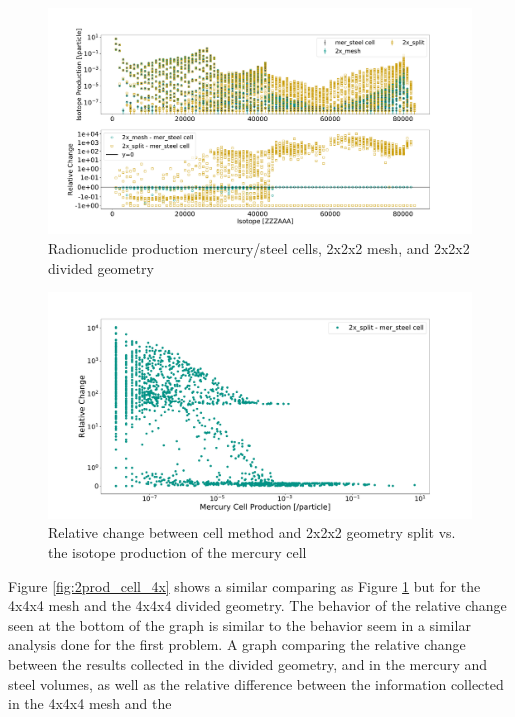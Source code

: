 %
\begin{figure}[H]
 \centering
 \includegraphics[scale=0.42,trim={2cm 1cm 3cm 2cm},clip]{../figs/toy_p2/prod_VPII_2x.pdf}
 \caption{Radionuclide production mercury/steel cells, 2x2x2 mesh, and 2x2x2 divided geometry}
 \label{fig:2prod_cell_2x}
\end{figure}
%
\begin{figure}[H]
 \centering
 \includegraphics[scale=0.4,trim={3cm 0.5cm 3cm 3cm},clip]{../figs/toy_p2/prod_VPII_rc_2x_split.pdf}
 \caption{Relative change between cell method and 2x2x2 geometry split vs. the isotope production of the mercury cell}
 \label{fig:2prod_cell_2x_rc}
\end{figure}
%
Figure \ref{fig:2prod_cell_4x} shows a similar comparing as Figure
\ref{fig:2prod_cell_2x} but for the 4x4x4 mesh and the 4x4x4 divided geometry.
The behavior of the relative change seen at the bottom of the graph is similar
to the behavior seem in a similar analysis done for the first problem.
A graph comparing the relative change between the results collected in the
divided geometry, and in the mercury and steel volumes, as well as the relative
difference between the information collected in the 4x4x4 mesh and the
